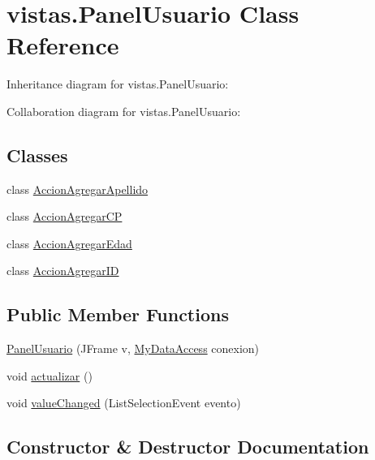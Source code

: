 \hypertarget{classvistas_1_1_panel_usuario}{}\section{vistas.\+Panel\+Usuario Class Reference}
\label{classvistas_1_1_panel_usuario}


Inheritance diagram for vistas.\+Panel\+Usuario\+:


Collaboration diagram for vistas.\+Panel\+Usuario\+:
\subsection*{Classes}
\begin{DoxyCompactItemize}
\item 
class \mbox{\hyperlink{classvistas_1_1_panel_usuario_1_1_accion_agregar_apellido}{Accion\+Agregar\+Apellido}}
\item 
class \mbox{\hyperlink{classvistas_1_1_panel_usuario_1_1_accion_agregar_c_p}{Accion\+Agregar\+CP}}
\item 
class \mbox{\hyperlink{classvistas_1_1_panel_usuario_1_1_accion_agregar_edad}{Accion\+Agregar\+Edad}}
\item 
class \mbox{\hyperlink{classvistas_1_1_panel_usuario_1_1_accion_agregar_i_d}{Accion\+Agregar\+ID}}
\end{DoxyCompactItemize}
\subsection*{Public Member Functions}
\begin{DoxyCompactItemize}
\item 
\mbox{\hyperlink{classvistas_1_1_panel_usuario_a21281d964400efa712d8d87864cf4d10}{Panel\+Usuario}} (J\+Frame v, \mbox{\hyperlink{classconexion_s_q_l_1_1_my_data_access}{My\+Data\+Access}} conexion)
\item 
void \mbox{\hyperlink{classvistas_1_1_panel_usuario_aa9aeb86ba4863b50f1c32ff55ce38932}{actualizar}} ()
\item 
void \mbox{\hyperlink{classvistas_1_1_panel_usuario_a5cea3757537523a738660ae7bbb41030}{value\+Changed}} (List\+Selection\+Event evento)
\end{DoxyCompactItemize}


\subsection{Constructor \& Destructor Documentation}
\mbox{\label{classvistas_1_1_panel_usuario_a21281d964400efa712d8d87864cf4d10}} 
